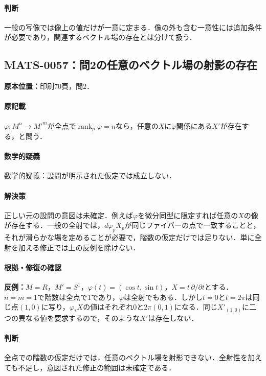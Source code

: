 \documentclass[a4paper,10pt]{ltjsarticle}
\begin{document}
\paragraph{判断}一般の写像では像上の値だけが一意に定まる．像の外も含む一意性には追加条件が必要であり，関連するベクトル場の存在とは分けて扱う．


\subsection*{MATS-0057：問2の任意のベクトル場の射影の存在}\label{math:MATS-0057}
\noindent\textbf{原本位置：}印刷70頁，問2．

\paragraph{原記載}$\varphi:M^n\to M'^m$が全点で$\operatorname{rank}_p\varphi=n$なら，任意の$X$に$\varphi$関係にある$X'$が存在する，と問う．

\paragraph{数学的疑義}数学的疑義：設問が明示された仮定では成立しない．

\paragraph{解決策}正しい元の設問の意図は未確定．例えば$\varphi$を微分同型に限定すれば任意の$X$の像が存在する．一般の全射では，$d\varphi_pX_p$が同じファイバーの点で一致することと，それが滑らかな場を定めることが必要で，階数の仮定だけでは足りない．単に全射を加える修正では上の反例を除けない．

\paragraph{根拠・修復の確認}\textbf{反例：}$M=R$，$M'=S^1$，$\varphi(t)=(\cos t,\sin t)$，$X=t\,\partial/\partial t$とする．$n=m=1$で階数は全点で1であり，$\varphi$は全射でもある．しかし$t=0$と$t=2\pi$は同じ点$(1,0)$に写り，$\varphi_*X$の値はそれぞれ$0$と$2\pi(0,1)$になる．同じ$X'_{(1,0)}$に二つの異なる値を要求するので，そのような$X'$は存在しない．

\paragraph{判断}全点での階数の仮定だけでは，任意のベクトル場を射影できない．全射性を加えても不足し，意図された修正の範囲は未確定である．
\end{document}
